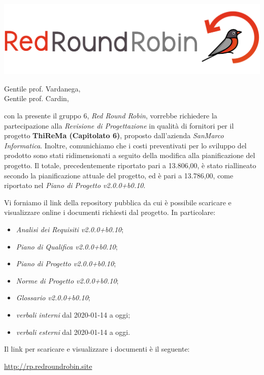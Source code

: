 \documentclass[12pt]{letter}
\date{09 marzo 2020}
\begin{document}
\begin{letter}{ }

\includegraphics[scale=0.17]{images/logo.png}

\opening{Gentile prof. Vardanega,\\ Gentile prof. Cardin, }

con la presente il gruppo 6, \textit{Red Round Robin}, vorrebbe richiedere la partecipazione alla \textit{Revisione di Progettazione} in qualità di fornitori per il progetto \textbf{ThiReMa (Capitolato 6)}, proposto dall'azienda \textit{SanMarco Informatica}.
\newline
Inoltre, comunichiamo che i costi preventivati per lo sviluppo del prodotto sono stati ridimensionati a seguito della modifica alla pianificazione del progetto. Il totale, precedentemente riportato pari a \EUR{}13.806,00, è stato riallineato secondo la pianificazione attuale del progetto, ed è pari a \EUR{}13.786,00, come riportato nel \textit{Piano di Progetto v2.0.0+b0.10}.

Vi forniamo il link della repository pubblica da cui è possibile scaricare e visualizzare online i documenti richiesti dal progetto.
In particolare:

\begin{itemize}
	\item \textit{Analisi dei Requisiti v2.0.0+b0.10};
	\item \textit{Piano di Qualifica v2.0.0+b0.10};
	\item \textit{Piano di Progetto v2.0.0+b0.10};
	\item \textit{Norme di Progetto v2.0.0+b0.10};
	\item \textit{Glossario v2.0.0+b0.10};
	\item \textit{verbali interni} dal 2020-01-14 a oggi;
	\item \textit{verbali esterni} dal 2020-01-14 a oggi.
\end{itemize}

\newpage

Il link per scaricare e visualizzare i documenti è il seguente:

\begin{center}
	\href{https://drive.google.com/open?id=1z_jr9JuH_Iq8XucOWsljbxFb59HqZOnK}{http://rp.redroundrobin.site}
\end{center}



\end{letter}
\end{document}

